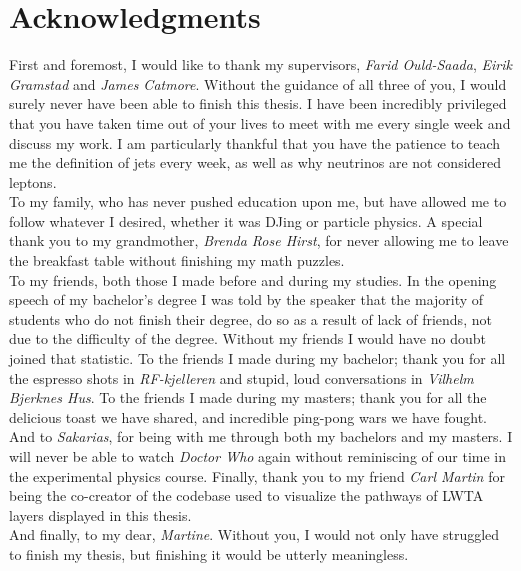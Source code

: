\chapter*{Acknowledgments}
First and foremost, I would like to thank my supervisors, \emph{Farid Ould-Saada}, \emph{Eirik Gramstad} and \emph{James Catmore}. 
Without the guidance of all three of you, I would surely never have been able to finish this thesis. I have been incredibly
privileged that you have taken time out of your lives to meet with me every single week and discuss my work. 
I am particularly thankful that you have the patience to teach me the definition of jets every week, as well as
why neutrinos are not considered leptons.
\\\newline
To my family, who has never pushed education upon me, but have allowed me to follow whatever I desired, whether it was DJing or 
particle physics. A special thank you to my grandmother, \emph{Brenda Rose Hirst}, for never allowing me to leave the breakfast table 
without finishing my math puzzles.
\\\newline
To my friends, both those I made before and during my studies. In the opening speech of my bachelor's degree I was told by the speaker that 
the majority of students who do not finish their degree, do so as a result of lack of friends, not due to the difficulty of the degree.
Without my friends I would have no doubt joined that statistic. To the friends I made during my bachelor; thank you for all the espresso shots in \emph{RF-kjelleren}
and stupid, loud conversations in \emph{Vilhelm Bjerknes Hus}. To the friends I made during my masters; thank you for all the delicious toast we have shared, and 
incredible ping-pong wars we have fought. And to \emph{Sakarias}, for being with me through both my bachelors and my masters. I will never be able 
to watch \emph{Doctor Who} again without reminiscing of our time in the experimental physics course. Finally, thank you to my friend \emph{Carl Martin} 
for being the co-creator of the codebase used to visualize the pathways of \acs{LWTA} layers displayed in this thesis. 
\\\newline
And finally, to my dear, \emph{Martine}. Without you, I would not only have struggled to finish my thesis, but finishing it would be utterly 
meaningless.
